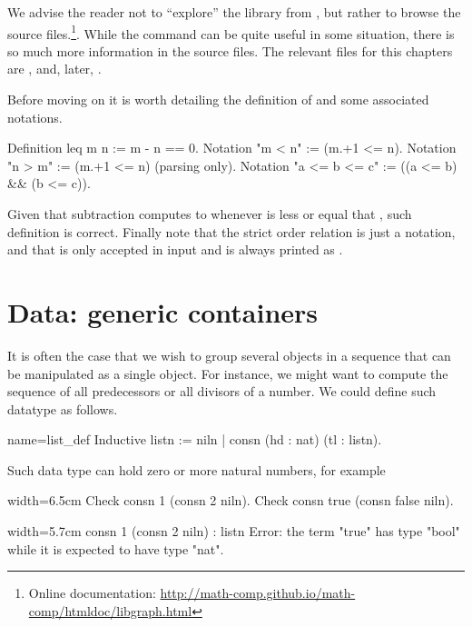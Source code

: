 We advise the reader not to ``explore'' the library from \Coq{}, but
rather to browse the source files.\footnote{Online documentation: \url{http://math-comp.github.io/math-comp/htmldoc/libgraph.html}}.
While the 
command can be quite useful in some situation, there is so much more
information in the source files.  
The relevant files for this chapters are , 
and, later, .


Before moving on it is worth detailing the definition of 
and some associated notations.

\begin{coq}{}{}
Definition leq m n := m - n == 0.
Notation "m < n"  := (m.+1 <= n).
Notation "n > m"  := (m.+1 <= n) (parsing only).
Notation "a <= b <= c" := ((a <= b) && (b <= c)).
\end{coq}
Given that subtraction computes to  whenever  is less or equal
that , such definition is correct.  Finally note that the strict order
relation is just a notation, and that  is only accepted in input
and is always printed as  .



\section{Data: generic containers}\label{sec:poly}

It is often the case that we wish to group several objects in a
sequence that can be manipulated as a single object.  For instance, we
might want to compute the sequence of all predecessors or all divisors
of a number.  We could define such datatype as follows.

\begin{coq}{name=list_def}{}
Inductive listn := niln | consn (hd : nat) (tl : listn).
\end{coq}

Such data type can hold zero or more natural numbers, for example

\begin{coq}{}{width=6.5cm}
Check consn 1 (consn 2 niln).
Check consn true (consn false niln).
$~$
$~$
\end{coq}{}{}
\begin{coqout}{}{width=5.7cm}
consn 1 (consn 2 niln) : listn
Error: the term "true" has
type "bool" while it is
expected to have type "nat".
\end{coqout}{}{}

